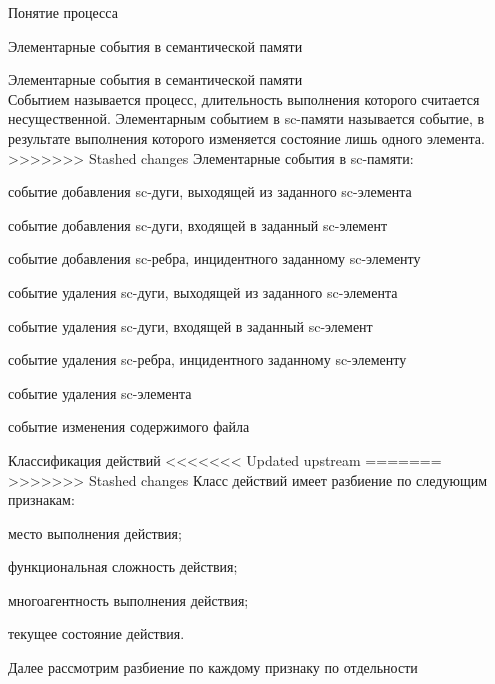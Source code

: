 \begin{frame}{\large Понятие процесса}
\begin{frame}{\large Элементарные события в семантической памяти}
\begin{frame}{Элементарные события в семантической памяти}
    \topline
    \justifying
    \vspace{30}
     \\
     
    Событием называется процесс, длительность выполнения которого считается несущественной. Элементарным событием в sc-памяти называется событие, в результате выполнения которого изменяется состояние лишь одного элемента.
>>>>>>> Stashed changes
    Элементарные события в sc-памяти:
    \begin{textitemize}
        \item событие добавления sc-дуги, выходящей из заданного sc-элемента
        \item событие добавления sc-дуги, входящей в заданный sc-элемент
        \item событие добавления sc-ребра, инцидентного заданному sc-элементу
        \item событие удаления sc-дуги, выходящей из заданного sc-элемента
        \item событие удаления sc-дуги, входящей в заданный sc-элемент
        \item событие удаления sc-ребра, инцидентного заданному sc-элементу
        \item событие удаления sc-элемента
        \item событие изменения содержимого файла
    \end{textitemize}
\end{frame}

\begin{frame}{Классификация действий}
<<<<<<< Updated upstream
=======
\topline
>>>>>>> Stashed changes
    Класс действий имеет разбиение по следующим признакам:
\begin{textitemize}
	\item место выполнения действия;
	\item функциональная сложность действия;
	\item многоагентность выполнения действия;
	\item текущее состояние действия.
\end{textitemize}
Далее рассмотрим разбиение по каждому признаку по отдельности
\end{frame}


\end{frame}
\end{frame}

